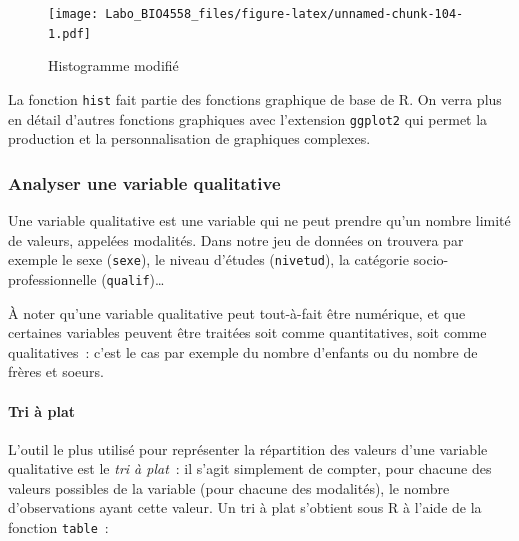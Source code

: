 \documentclass[12pt,]{book}
\newenvironment{Shaded}{\begin{snugshade}}{\end{snugshade}}
\newcommand{\DataTypeTok}[1]{\textcolor[rgb]{0.27,0.27,0.27}{#1}}
\newcommand{\KeywordTok}[1]{\textcolor[rgb]{0.27,0.27,0.27}{\textbf{#1}}}
\newcommand{\NormalTok}[1]{#1}
\newcommand{\OperatorTok}[1]{\textcolor[rgb]{0.43,0.43,0.43}{\textbf{#1}}}
\newcommand{\StringTok}[1]{\textcolor[rgb]{0.5,0.5,0.5}{#1}}
\let\oldparagraph\paragraph
\renewcommand{\paragraph}[1]{\oldparagraph{#1}\mbox{}}
\begin{document}
\begin{Shaded}
\end{Shaded}

\begin{figure}
\centering
\texttt{[image: Labo\_BIO4558\_files/figure-latex/unnamed-chunk-104-1.pdf]}
\caption{\label{fig:unnamed-chunk-104}Histogramme modifié}
\end{figure}

La fonction \texttt{hist} fait partie des fonctions graphique de base de R. On verra plus en détail d'autres fonctions graphiques
avec l'extension \texttt{ggplot2} qui permet la production et la personnalisation de graphiques complexes.

\hypertarget{analyser-une-variable-qualitative}{%
\subsubsection{Analyser une variable qualitative}\label{analyser-une-variable-qualitative}}

Une variable qualitative est une variable qui ne peut prendre qu'un nombre limité de valeurs, appelées modalités. Dans notre jeu de données on trouvera par exemple le sexe (\texttt{sexe}), le niveau d'études (\texttt{nivetud}), la catégorie socio-professionnelle (\texttt{qualif})\ldots{}

À noter qu'une variable qualitative peut tout-à-fait être numérique, et que certaines variables peuvent être traitées soit comme quantitatives, soit comme qualitatives~: c'est le cas par exemple du nombre d'enfants ou du nombre de frères et soeurs.

\hypertarget{tri-uxe0-plat}{%
\paragraph{Tri à plat}\label{tri-uxe0-plat}}

L'outil le plus utilisé pour représenter la répartition des valeurs d'une variable qualitative est le \emph{tri à plat}~: il s'agit simplement de compter, pour chacune des valeurs possibles de la variable (pour chacune des modalités), le nombre d'observations ayant cette valeur. Un tri à plat s'obtient sous R à l'aide de la fonction \texttt{table}~:
\end{document}
